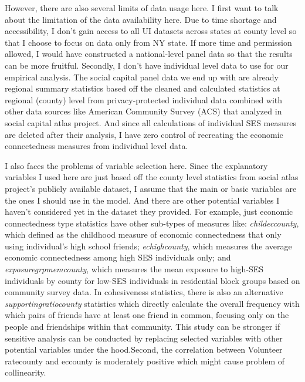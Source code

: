 \documentclass{article}
\begin{document}
However, there are also several limits of data usage here. I first want to talk about the limitation of the data availability here. Due to time shortage and accessibility, I don't gain access to all UI datasets across states at county level so that I choose to focus on data only from NY state. If more time and permission allowed, I would have constructed a national-level panel data so that the results can be more fruitful. Secondly, I don't have individual level data to use for our empirical analysis. The social capital panel data we end up with are already regional summary statistics based off the cleaned and calculated statistics at regional (county) level from privacy-protected individual data combined with other data sources like American Community Survey (ACS) that analyzed in social capital atlas project. And since all calculations of individual SES measures are deleted after their analysis, I have zero control of recreating the economic connectedness measures from individual level data.



I also faces the problems of variable selection here. Since the explanatory variables I used here are just based off the county level statistics from social atlas project's publicly available dataset, I assume that the main or basic variables are the ones I should use in the model. And there are other potential variables I haven't considered yet in the dataset they provided. For example, just economic connectedness type statistics have other sub-types of measures like: \textit{child\textunderscore ec\textunderscore county}, which defined as the childhood measure of economic connectedness that only using individual's high school friends; \textit{ec\textunderscore high\textunderscore county}, which measures the average economic connectedness among high SES individuals only; and \textit{exposure\textunderscore grp\textunderscore mem\textunderscore county}, which measures the mean exposure to high-SES individuals by county for low-SES individuals in residential block groups based on community survey data. In cohesiveness statistics, there is also an alternative \textit{supporting\textunderscore ratio\textunderscore county} statistics which directly calculate the overall frequency with which pairs of friends have at least one friend in common, focusing only on the people and friendships within that community. This study can be stronger if sensitive analysis can be conducted by replacing selected variables with other potential variables under the hood.Second, the correlation between Volunteer \textunderscore rate\textunderscore county and ec\textunderscore county is moderately positive which might cause problem of collinearity. 
\end{document}
